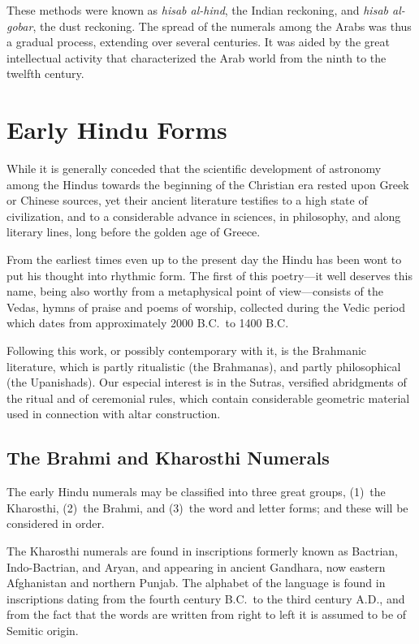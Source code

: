 \documentclass[11pt,a4paper]{article}
\begin{document}
These methods were known as \textit{hisab al-hind}, the Indian reckoning, and \textit{hisab al-gobar}, the dust reckoning. The spread of the numerals among the Arabs was thus a gradual process, extending over several centuries. It was aided by the great intellectual activity that characterized the Arab world from the ninth to the twelfth century.

\newpage

\section{Early Hindu Forms}\label{ch:hindu-forms}

While it is generally conceded that the scientific development of astronomy among the Hindus towards the beginning of the Christian era rested upon Greek or Chinese sources, yet their ancient literature testifies to a high state of civilization, and to a considerable advance in sciences, in philosophy, and along literary lines, long before the golden age of Greece.

From the earliest times even up to the present day the Hindu has been wont to put his thought into rhythmic form. The first of this poetry---it well deserves this name, being also worthy from a metaphysical point of view---consists of the Vedas, hymns of praise and poems of worship, collected during the Vedic period which dates from approximately 2000 B.C.\ to 1400 B.C.

Following this work, or possibly contemporary with it, is the Brahmanic literature, which is partly ritualistic (the Brahmanas), and partly philosophical (the Upanishads). Our especial interest is in the Sutras, versified abridgments of the ritual and of ceremonial rules, which contain considerable geometric material used in connection with altar construction.

\subsection*{The Brahmi and Kharosthi Numerals}

The early Hindu numerals may be classified into three great groups, (1)~the Kharosthi, (2)~the Brahmi, and (3)~the word and letter forms; and these will be considered in order.

The Kharosthi numerals are found in inscriptions formerly known as Bactrian, Indo-Bactrian, and Aryan, and appearing in ancient Gandhara, now eastern Afghanistan and northern Punjab. The alphabet of the language is found in inscriptions dating from the fourth century B.C.\ to the third century A.D., and from the fact that the words are written from right to left it is assumed to be of Semitic origin.
\end{document}
